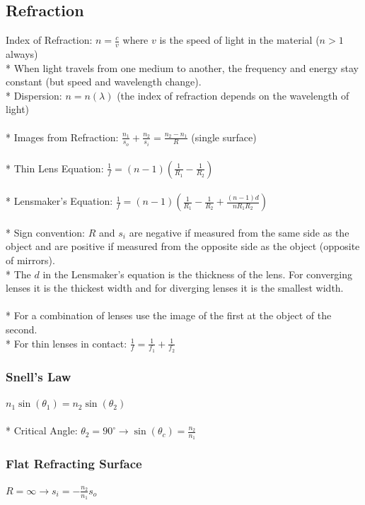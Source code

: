 \subsection{Refraction}
Index of Refraction: \(\displaystyle n=\frac{c}{v}\) where \(v\) is the speed of light in the material (\(n>1\) always)\\*
When light travels from one medium to another, the frequency and energy stay constant (but speed and wavelength change).\\*
Dispersion: \(n=n(\lambda)\) (the index of refraction depends on the wavelength of light)\\\\*
Images from Refraction: \(\displaystyle \frac{n_1}{s_o}+\frac{n_2}{s_i}=\frac{n_2-n_1}{R}\) (single surface)\\\\*
Thin Lens Equation: \(\displaystyle \frac{1}{f}=(n-1)\left(\frac{1}{R_1}-\frac{1}{R_2}\right)\)\\\\*
Lensmaker's Equation: \(\displaystyle \frac{1}{f}=(n-1)\left(\frac{1}{R_1}-\frac{1}{R_2}+\frac{(n-1)d}{nR_1R_2}\right)\)\\\\*
Sign convention: \(R\) and \(s_i\) are negative if measured from the same side as the object and are positive if measured from the opposite side as the object (opposite of mirrors).\\*
The \(d\) in the Lensmaker's equation is the thickness of the lens. For converging lenses it is the thickest width and for diverging lenses it is the smallest width.\\\\*
For a combination of lenses use the image of the first at the object of the second.\\*
For thin lenses in contact: \(\displaystyle\frac{1}{f}=\frac{1}{f_1}+\frac{1}{f_2}\)

\subsubsection{Snell's Law}
\(n_1\sin(\theta_1)=n_2\sin(\theta_2)\)\\\\*
Critical Angle: \(\displaystyle\theta_2=90^{\circ}\to \sin(\theta_c)=\frac{n_2}{n_1}\)

\subsubsection{Flat Refracting Surface}
\(\displaystyle R=\infty\to s_i=-\frac{n_2}{n_1}s_o\)

